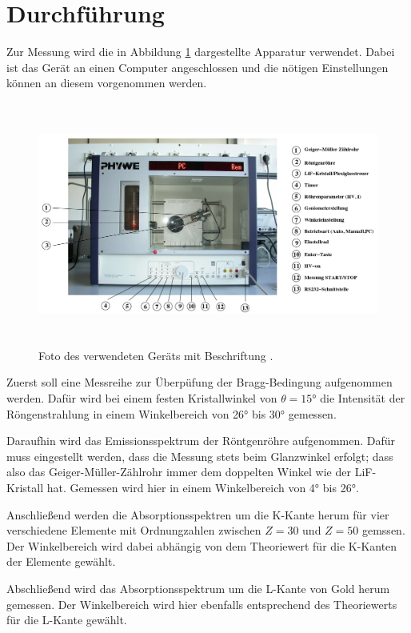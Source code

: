 \section{Durchführung}
\label{sec:Durchführung}

Zur Messung wird die in Abbildung \ref{fig:geraet} dargestellte Apparatur verwendet.
Dabei ist das Gerät an einen Computer angeschlossen und die nötigen Einstellungen
können an diesem vorgenommen werden.

\begin{figure}
  \centering
  \includegraphics[height=8cm]{data/geraet.png}
  \caption{Foto des verwendeten Geräts mit Beschriftung \cite{Versuchsanleitung}.}
  \label{fig:geraet}
\end{figure}

Zuerst soll eine Messreihe zur Überpüfung der Bragg-Bedingung aufgenommen werden.
Dafür wird bei einem festen Kristallwinkel von $\theta=15°$ die Intensität der
Röngenstrahlung in einem Winkelbereich von 26° bis 30° gemessen.

Daraufhin wird das Emissionsspektrum der Röntgenröhre aufgenommen. Dafür muss eingestellt
werden, dass die Messung stets beim Glanzwinkel erfolgt; dass also das Geiger-Müller-Zählrohr
immer dem doppelten Winkel wie der LiF-Kristall hat. Gemessen wird hier in einem
Winkelbereich von 4° bis 26°.

Anschließend werden die Absorptionsspektren um die K-Kante herum für vier verschiedene
Elemente mit Ordnungzahlen zwischen $Z=30$ und $Z=50$ gemssen. Der Winkelbereich wird
dabei abhängig von dem Theoriewert für die K-Kanten der Elemente gewählt.

Abschließend wird das Absorptionsspektrum um die L-Kante von Gold herum gemessen.
Der Winkelbereich wird hier ebenfalls entsprechend des Theoriewerts für die
L-Kante gewählt.
